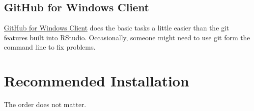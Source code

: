 \documentclass[
]{book}
\begin{document}
\hypertarget{github-for-windows-client}{%
\subsection{GitHub for Windows Client}\label{github-for-windows-client}}

\href{http://windows.github.com/}{GitHub for Windows Client} does the basic tasks a little easier than the git features built into RStudio. Occasionally, someone might need to use git form the command line to fix problems.

\hypertarget{installation-recommended}{%
\section{Recommended Installation}\label{installation-recommended}}

The order does not matter.
\end{document}

